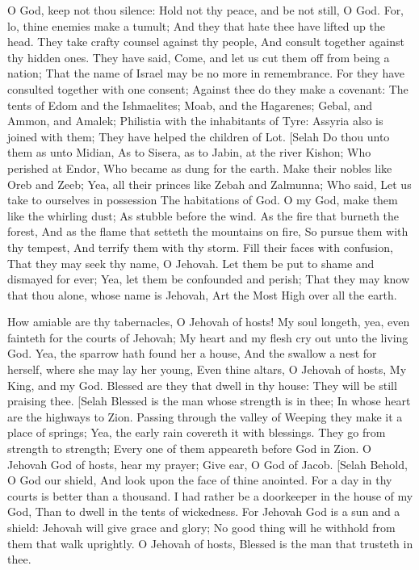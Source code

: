 O God, keep not thou silence: Hold not thy peace, and be not still, O God.  For, lo, thine enemies make a tumult; And they that hate thee have lifted up the head.  They take crafty counsel against thy people, And consult together against thy hidden ones.  They have said, Come, and let us cut them off from being a nation; That the name of Israel may be no more in remembrance.  For they have consulted together with one consent; Against thee do they make a covenant:  The tents of Edom and the Ishmaelites; Moab, and the Hagarenes;  Gebal, and Ammon, and Amalek; Philistia with the inhabitants of Tyre:  Assyria also is joined with them; They have helped the children of Lot. [Selah  Do thou unto them as unto Midian, As to Sisera, as to Jabin, at the river Kishon;  Who perished at Endor, Who became as dung for the earth.  Make their nobles like Oreb and Zeeb; Yea, all their princes like Zebah and Zalmunna;  Who said, Let us take to ourselves in possession The habitations of God.  O my God, make them like the whirling dust; As stubble before the wind.  As the fire that burneth the forest, And as the flame that setteth the mountains on fire,  So pursue them with thy tempest, And terrify them with thy storm.  Fill their faces with confusion, That they may seek thy name, O Jehovah.  Let them be put to shame and dismayed for ever; Yea, let them be confounded and perish;  That they may know that thou alone, whose name is Jehovah, Art the Most High over all the earth. 

How amiable are thy tabernacles, O Jehovah of hosts!  My soul longeth, yea, even fainteth for the courts of Jehovah; My heart and my flesh cry out unto the living God.  Yea, the sparrow hath found her a house, And the swallow a nest for herself, where she may lay her young, Even thine altars, O Jehovah of hosts, My King, and my God.  Blessed are they that dwell in thy house: They will be still praising thee. [Selah  Blessed is the man whose strength is in thee; In whose heart are the highways to Zion.  Passing through the valley of Weeping they make it a place of springs; Yea, the early rain covereth it with blessings.  They go from strength to strength; Every one of them appeareth before God in Zion.  O Jehovah God of hosts, hear my prayer; Give ear, O God of Jacob. [Selah  Behold, O God our shield, And look upon the face of thine anointed.  For a day in thy courts is better than a thousand. I had rather be a doorkeeper in the house of my God, Than to dwell in the tents of wickedness.  For Jehovah God is a sun and a shield: Jehovah will give grace and glory; No good thing will he withhold from them that walk uprightly.  O Jehovah of hosts, Blessed is the man that trusteth in thee. 

